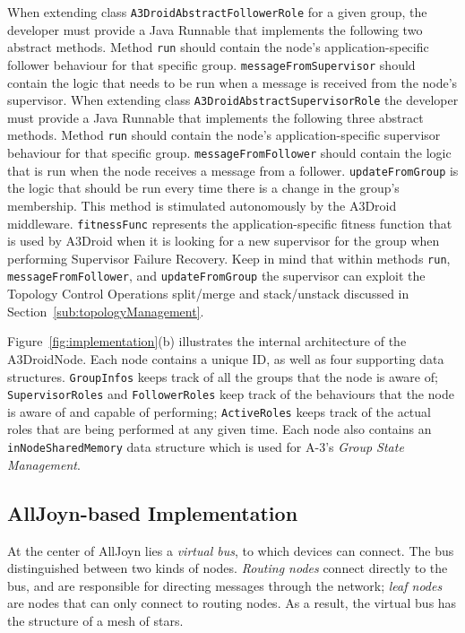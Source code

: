 When extending class \texttt{A3DroidAbstractFollowerRole} for a given group, the developer must provide a Java Runnable that implements the following two abstract methods. Method \texttt{run} should contain the node's application-specific follower behaviour for that specific group. \texttt{messageFromSupervisor} should contain the logic that needs to be run when a message is received from the node's supervisor. When extending class \texttt{A3DroidAbstractSupervisorRole} the developer must provide a Java Runnable that implements the following three abstract methods. Method \texttt{run} should contain the node's application-specific supervisor behaviour for that specific group. \texttt{messageFromFollower} should contain the logic that is run when the node receives a message from a follower. \texttt{updateFromGroup} is the logic that should be run every time there is a change in the group's membership. This method is stimulated autonomously by the A3Droid middleware. \texttt{fitnessFunc} represents the application-specific fitness function that is used by A3Droid when it is looking for a new supervisor for the group when performing Supervisor Failure Recovery. Keep in mind that within methods \texttt{run}, \texttt{messageFromFollower}, and \texttt{updateFromGroup} the supervisor can exploit the Topology Control Operations split/merge and stack/unstack discussed in Section~\ref{sub:topologyManagement}. 

Figure~\ref{fig:implementation}(b) illustrates the internal architecture of the A3DroidNode. Each node contains a unique ID, as well as four supporting data structures. \texttt{GroupInfos} keeps track of all the groups that the node is aware of; \texttt{SupervisorRoles} and \texttt{FollowerRoles} keep track of the behaviours that the node is aware of and capable of performing; \texttt{ActiveRoles} keeps track of the actual roles that are being performed at any given time. Each node also contains an \texttt{inNodeSharedMemory} data structure which is used for A-3's \emph{Group State Management}.

\subsection{AllJoyn-based Implementation}
\label{subg:a3droidNodes}

At the center of AllJoyn lies a \emph{virtual bus}, to which devices can connect. The bus distinguished between two kinds of nodes. \emph{Routing nodes} connect directly to the bus, and are responsible for directing messages through the network; \emph{leaf nodes} are nodes that can only connect to routing nodes. As a result, the virtual bus has the structure of a mesh of stars.

